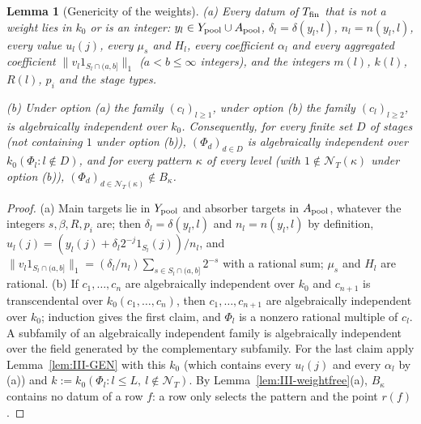 \documentclass[10pt]{amsart}
\newtheorem{lemma}[theorem]{Lemma}
\theoremstyle{definition}
\theoremstyle{remark}
\begin{document}
\begin{lemma}[Genericity of the weights]\label{lem:III-GENfin}
\textup{(a)} Every datum of $T_{\rm fin}$ that is not a weight lies in $k_0$ or is
an integer: $y_l\in Y_{\rm pool}\cup A_{\rm pool}$, $\delta_l=\delta(y_l,l)$,
$n_l=n(y_l,l)$, every value $u_l(j)$, every $\mu_s$ and $H_l$, every coefficient
$\alpha_l$ and every aggregated coefficient $\|v_l1_{S_l\cap(a,b]}\|_1$
\textup{(}$a<b\le\infty$ integers\textup{)}, and the integers $m(l)$, $k(l)$,
$R(l)$, $p_i$ and the stage types.

\textup{(b)} Under option \textup{(a)} the family $(c_l)_{l\ge1}$, under option
\textup{(b)} the family $(c_l)_{l\ge2}$, is algebraically independent over
$k_0$.  Consequently, for every finite set $D$ of stages \textup{(}not containing
$1$ under option \textup{(b)}\textup{)}, $(\Phi_d)_{d\in D}$ is algebraically
independent over $k_0(\Phi_l:l\notin D)$, and for every pattern $\kappa$ of
every level \textup{(}with $1\notin\mathcal N_T(\kappa)$ under option
\textup{(b)}\textup{)}, $(\Phi_d)_{d\in\mathcal N_T(\kappa)}\notin B_\kappa$.
\end{lemma}

\begin{proof}
(a) Main targets lie in $Y_{\rm pool}$ and absorber targets in $A_{\rm pool}$,
whatever the integers $s,\beta,R,p_i$ are; then $\delta_l=\delta(y_l,l)$ and
$n_l=n(y_l,l)$ by definition, $u_l(j)=(y_l(j)+\delta_l2^{-j}1_{S_l}(j))/n_l$, and
$\|v_l1_{S_l\cap(a,b]}\|_1=(\delta_l/n_l)\sum_{s\in S_l\cap(a,b]}2^{-s}$ with a
rational sum; $\mu_s$ and $H_l$ are rational.
(b) If $c_1,\dots,c_n$ are algebraically independent over $k_0$ and $c_{n+1}$
is transcendental over $k_0(c_1,\dots,c_n)$, then $c_1,\dots,c_{n+1}$ are
algebraically independent over $k_0$; induction gives the first claim, and
$\Phi_l$ is a nonzero rational multiple of $c_l$.  A subfamily of an
algebraically independent family is algebraically independent over the field
generated by the complementary subfamily.  For the last claim apply
Lemma~\ref{lem:III-GEN} with this $k_0$ (which contains every $u_l(j)$ and
every $\alpha_l$ by (a)) and $k:=k_0(\Phi_l:l\le L,\ l\notin\mathcal N_T)$.  By
Lemma~\ref{lem:III-weightfree}(a), $B_\kappa$ contains no datum of a row $f$:
a row only selects the pattern and the point $r(f)$.
\end{proof}
\end{document}
